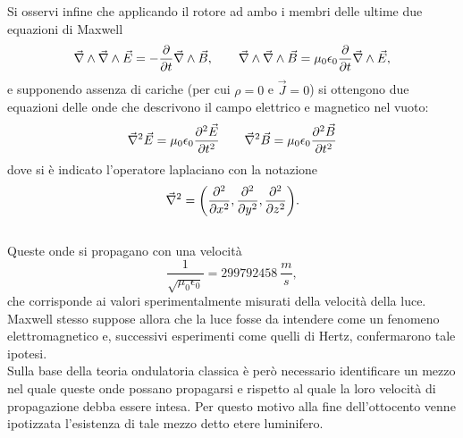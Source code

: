 Si osservi infine che applicando il rotore ad ambo 
i membri delle ultime due equazioni di Maxwell
\begin{equation*}
	\vec{\nabla}\wedge\vec{\nabla}\wedge\vec{E}=-\frac{\partial}{\partial t}\vec{\nabla}\wedge\vec{B},
	\qquad \vec{\nabla}\wedge\vec{\nabla}\wedge\vec{B}=\mu_0\epsilon_0\frac{\partial}{\partial t}
	\vec{\nabla}\wedge\vec{E},
\end{equation*}
e supponendo assenza di cariche (per cui $\rho=0$ e $\vec{J}=0$) si ottengono due equazioni delle onde che descrivono 
il campo elettrico e magnetico nel vuoto:
\begin{equation}
	\vec{\nabla}^2\vec{E}=\mu_0\epsilon_0\frac{\partial^2\vec{E}}{\partial t^2} \qquad \vec{\nabla}^2\vec{B}=
	\mu_0\epsilon_0\frac{\partial^2\vec{B}}{\partial t^2}
	\label{OndeEMVuoto}
\end{equation}
dove si è indicato l'operatore laplaciano con la notazione $$\vec{\nabla}^2=\bigg(\frac{\partial^2 }{\partial x^2},\frac{\partial^2 }{\partial y^2},\frac{\partial^2 }{\partial z^2}\bigg).$$\\
Queste onde si propagano con una velocità $$\frac{1}{\sqrt{\mu_0\epsilon_0}}=299792458\  \frac{m}{s},$$ 
che corrisponde ai valori sperimentalmente misurati della velocità della luce.\\ Maxwell stesso suppose allora che la luce fosse da intendere come un fenomeno elettromagnetico e, successivi esperimenti come quelli di Hertz, confermarono tale ipotesi.\\
Sulla base della teoria ondulatoria classica è però necessario identificare un mezzo nel quale queste onde possano 
propagarsi e rispetto al quale la loro velocità di propagazione debba essere intesa. Per questo motivo alla fine dell'ottocento venne ipotizzata l'esistenza di tale mezzo detto etere luminifero.